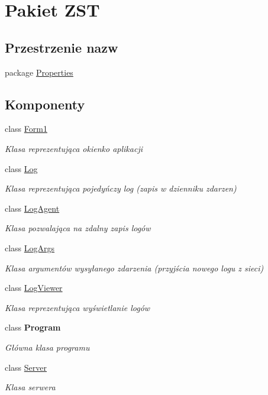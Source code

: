 \hypertarget{namespace_z_s_t}{}\section{Pakiet Z\+S\+T}
\label{namespace_z_s_t}
\subsection*{Przestrzenie nazw}
\begin{DoxyCompactItemize}
\item 
package \hyperlink{namespace_z_s_t_1_1_properties}{Properties}
\end{DoxyCompactItemize}
\subsection*{Komponenty}
\begin{DoxyCompactItemize}
\item 
class \hyperlink{class_z_s_t_1_1_form1}{Form1}
\begin{DoxyCompactList}\small\item\em Klasa reprezentująca okienko aplikacji \end{DoxyCompactList}\item 
class \hyperlink{class_z_s_t_1_1_log}{Log}
\begin{DoxyCompactList}\small\item\em Klasa reprezentująca pojedyńczy log (zapis w dzienniku zdarzen) \end{DoxyCompactList}\item 
class \hyperlink{class_z_s_t_1_1_log_agent}{Log\+Agent}
\begin{DoxyCompactList}\small\item\em Klasa pozwalająca na zdalny zapis logów \end{DoxyCompactList}\item 
class \hyperlink{class_z_s_t_1_1_log_args}{Log\+Args}
\begin{DoxyCompactList}\small\item\em Klasa argumentów wysyłanego zdarzenia (przyjścia nowego logu z sieci) \end{DoxyCompactList}\item 
class \hyperlink{class_z_s_t_1_1_log_viewer}{Log\+Viewer}
\begin{DoxyCompactList}\small\item\em Klasa reprezentująca wyświetlanie logów \end{DoxyCompactList}\item 
class {\bfseries Program}
\begin{DoxyCompactList}\small\item\em Główna klasa programu \end{DoxyCompactList}\item 
class \hyperlink{class_z_s_t_1_1_server}{Server}
\begin{DoxyCompactList}\small\item\em Klasa serwera \end{DoxyCompactList}\end{DoxyCompactItemize}
